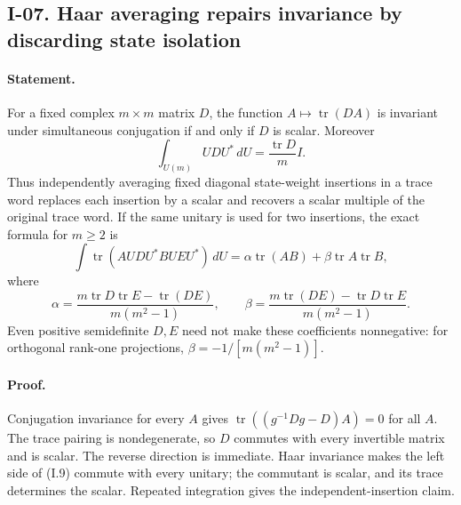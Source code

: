 \subsection{I-07. Haar averaging repairs invariance by discarding state isolation}
\label{I-07}

\paragraph{Statement.}
For a fixed complex $m\times m$ matrix $D$, the function
$A\mapsto\operatorname{tr}(DA)$ is invariant under simultaneous
conjugation if and only if $D$ is scalar.  Moreover
\[
 \int_{U(m)}UDU^*\,dU=\frac{\operatorname{tr}D}{m}I.
\tag{I.9}
\]
Thus independently averaging fixed diagonal state-weight insertions
in a trace word replaces each insertion by a scalar and recovers
a scalar multiple of the original trace word.  If the same unitary
is used for two insertions, the exact formula for $m\ge2$ is
\[
 \int\operatorname{tr}(A UDU^* B UEU^*)\,dU
 =\alpha\operatorname{tr}(AB)+\beta\operatorname{tr}A\operatorname{tr}B,
\tag{I.10}
\]
where
\[
 \alpha=\frac{m\operatorname{tr}D\operatorname{tr}E-
                    \operatorname{tr}(DE)}{m(m^2-1)},\qquad
 \beta=\frac{m\operatorname{tr}(DE)-
                    \operatorname{tr}D\operatorname{tr}E}{m(m^2-1)}.
\]
Even positive semidefinite $D,E$ need not make these coefficients
nonnegative: for orthogonal rank-one projections,
$\beta=-1/[m(m^2-1)]$.

\paragraph{Proof.}
Conjugation invariance for every $A$ gives
$\operatorname{tr}((g^{-1}Dg-D)A)=0$ for all $A$.  The trace pairing
is nondegenerate, so $D$ commutes with every invertible matrix and
is scalar.  The reverse direction is immediate.  Haar invariance
makes the left side of (I.9) commute with every unitary; the
commutant is scalar, and its trace determines the scalar.  Repeated
integration gives the independent-insertion claim.

